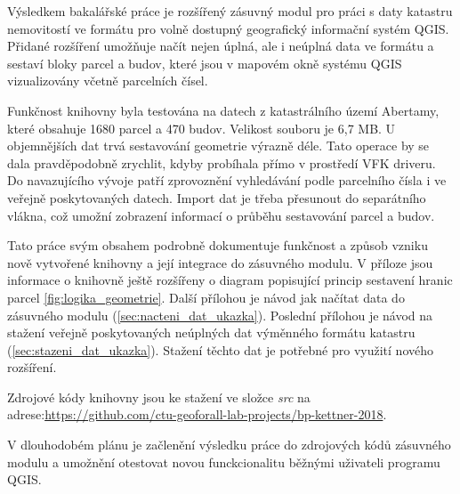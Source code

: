 Výsledkem bakalářské práce je rozšířený zásuvný modul pro práci s daty
katastru nemovitostí ve formátu  pro volně dostupný
geografický informační systém QGIS. Přidané rozšíření umožňuje načít
nejen úplná, ale i neúplná data ve formátu  a sestaví bloky
parcel a budov, které jsou v mapovém okně systému QGIS 
vizualizovány včetně parcelních čísel.

Funkčnost knihovny byla testována na datech z katastrálního území
Abertamy, které obsahuje 1680 parcel a 470 budov. Velikost 
souboru je 6,7 MB. U objemnějších dat trvá sestavování geometrie
výrazně déle. Tato operace by se dala pravděpodobně zrychlit, kdyby
probíhala přímo v
prostředí VFK driveru. Do navazujícího vývoje patří zprovoznění
vyhledávání podle parcelního čísla i ve veřejně poskytovaných
datech. Import dat je třeba přesunout do separátního vlákna, což
umožní zobrazení informací o průběhu sestavování parcel a budov.

Tato práce svým obsahem podrobně dokumentuje funkčnost a způsob vzniku
nově vytvořené knihovny a její integrace do zásuvného modulu. V příloze jsou informace o knihovně ještě
rozšířeny o diagram popisující princip sestavení hranic
parcel \ref{fig:logika_geometrie}. Další přílohou je návod jak načítat
data do zásuvného modulu (\ref{sec:nacteni_dat_ukazka}). Poslední
přílohou je návod na stažení veřejně poskytovaných neúplných dat
výměnného formátu katastru (\ref{sec:stazeni_dat_ukazka}). Stažení
těchto dat je potřebné pro využití nového rozšíření.

Zdrojové kódy knihovny jsou ke stažení ve složce \textit{src} na adrese:\newline \href{https://github.com/ctu-geoforall-lab-projects/bp-kettner-2018}{https://github.com/ctu-geoforall-lab-projects/bp-kettner-2018}.

V dlouhodobém plánu je začlenění výsledku práce do zdrojových kódů
zásuvného modulu a umožnění otestovat novou funckcionalitu běžnými
uživateli programu QGIS.
